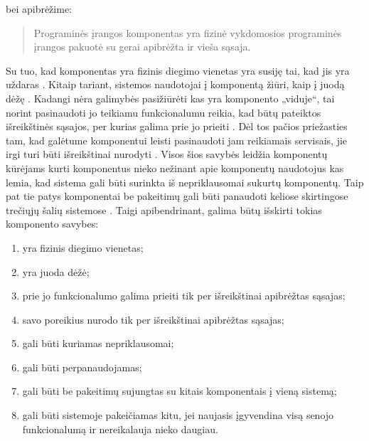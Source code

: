 bei \cite[1]{Hopkins:2000:CP:352183.352198} apibrėžime:
\begin{quote}
  Programinės įrangos komponentas yra fizinė vykdomosios programinės
  įrangos pakuotė su gerai apibrėžta ir vieša sąsaja.
\end{quote}

Su tuo, kad komponentas yra fizinis diegimo vienetas yra susiję
tai, kad jis yra uždaras
\cite[36]{cs-beyond-object-oriented-programming}. Kitaip tariant,
sistemos naudotojai į komponentą žiūri, kaip į juodą
dėžę \cite[2]{Gill:2003:CMF:966221.966237}.
Kadangi nėra galimybės pasižiūrėti kas yra komponento „viduje“,
tai norint pasinaudoti jo teikiamu funkcionalumu reikia, kad būtų
pateiktos išreikštinės sąsajos, per kurias galima prie jo
prieiti \cite[387]{objects-components-and-frameworks-with-uml}
\cite[36]{cs-beyond-object-oriented-programming}. Dėl tos
pačios priežasties tam, kad galėtume komponentui leisti pasinaudoti
jam reikiamais servisais, jie irgi turi būti išreikštinai nurodyti
\cite[387]{objects-components-and-frameworks-with-uml}
\cite[36]{cs-beyond-object-oriented-programming}. Visos šios
savybės leidžia komponentų kūrėjams kurti komponentus nieko
nežinant apie komponentų naudotojus \cite[2]{Gill:2003:CMF:966221.966237}
\cite[139]{meyer1999components}
kas lemia, kad sistema gali būti surinkta iš nepriklausomai sukurtų
komponentų. Taip pat tie patys komponentai be pakeitimų gali būti
panaudoti keliose skirtingose trečiųjų šalių sistemose
\cite[388]{objects-components-and-frameworks-with-uml}
\cite[36]{cs-beyond-object-oriented-programming}. Taigi
apibendrinant, galima būtų išskirti tokias komponento savybes:
\begin{enumerate}
  \item \label{com:exe:deployment} yra fizinis diegimo vienetas;
  \item \label{com:exe:blackbox} yra juoda dėžė;
  \item \label{com:exe:interfaceprovider} prie jo funkcionalumo galima
    prieiti tik per išreikštinai apibrėžtas sąsajas;
  \item \label{com:exe:interfaceuser} savo poreikius nurodo tik per
    išreikštinai apibrėžtas sąsajas;
  \item \label{com:exe:independent} gali būti kuriamas nepriklausomai;
  \item \label{com:exe:reusable} gali būti perpanaudojamas;
  \item \label{com:exe:composed} gali būti be pakeitimų sujungtas su
    kitais komponentais į vieną sistemą;
  \item \label{com:exe:interchangable} gali būti sistemoje
    pakeičiamas kitu, jei naujasis įgyvendina visą senojo
    funkcionalumą ir nereikalauja nieko daugiau.
\end{enumerate}

